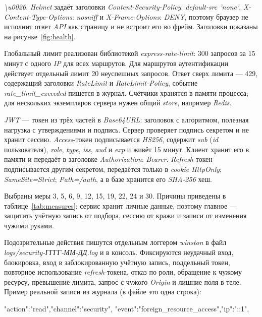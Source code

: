 \documentclass{stp}
\begin{document}
\begin{stpnum}
    \textit{\textbackslash u0026}. \textit{Helmet} задаёт заголовки
    \textit{Content-Security-Policy}: \textit{default-src 'none'}, \textit{X-Content-Type-Options}:
    \textit{nosniff} и \textit{X-Frame-Options}: \textit{DENY}, поэтому браузер не исполнит ответ
    \textit{API} как страницу и не встроит его во фрейм. Заголовки показаны на
    рисунке~\ref{fig:health}.
  \item Глобальный лимит реализован библиотекой \textit{express-rate-limit}:
    300 запросов за 15 минут с одного \textit{IP} для всех маршрутов. Для
    маршрутов аутентификации действует отдельный лимит 20 неуспешных
    запросов. Ответ сверх лимита — 429, содержащий заголовки \textit{RateLimit} и
    \textit{RateLimit-Policy}, событие \textit{rate\_limit\_exceeded} пишется в журнал.
    Счётчики хранятся в памяти процесса; для нескольких экземпляров
    сервера нужен общий \textit{store}, например \textit{Redis}.
  \item \textit{JWT} — токен из трёх частей в \textit{Base64URL}: заголовок с алгоритмом,
    полезная нагрузка с утверждениями и подпись. Сервер проверяет
    подпись секретом и не хранит сессию. \textit{Access}-токен подписывается
    \textit{HS256}, содержит \textit{sub} (\textit{id} пользователя), \textit{role}, \textit{type}, \textit{iss}, \textit{aud} и \textit{exp}
    и живёт 15 минут. Клиент хранит его в памяти и передаёт в заголовке
    \textit{Authorization}: \textit{Bearer}. \textit{Refresh}-токен подписывается другим секретом,
    передаётся только в \textit{cookie HttpOnly}; \textit{SameSite=Strict}; \textit{Path=/auth},
    а в базе хранится его \textit{SHA-256} хеш.
  \item Выбраны меры 3, 5, 6, 9, 12, 15, 19, 22, 24 и 30. Причины
    приведены в таблице~\ref{tab:measures}: сервис хранит личные данные,
    поэтому главное — защитить учётную запись от подбора, сессию от
    кражи и записи от изменения чужими руками.
  \item Подозрительные действия пишутся отдельным логгером \textit{winston} в
    файл \textit{logs/security-ГГГГ-ММ-ДД.log} и в консоль. Фиксируются
    неудачный вход, блокировка, вход в заблокированную учётную запись,
    поддельный токен, повторное использование \textit{refresh}-токена, отказ по
    роли, обращение к чужому ресурсу, превышение лимита, запрос с чужого
    \textit{Origin} и лишние поля в теле. Пример реальной записи из журнала
    (в файле это одна строка):
\begin{stplisting}
{"action":"read","channel":"security",
 "event":"foreign_resource_access","ip":"::1",
}
\end{stplisting}
\end{stpnum}
\end{document}
